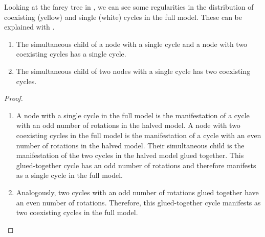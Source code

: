 Looking at the farey tree in , we can see some regularities in the distribution of coexisting (yellow) and single (white) cycles in the full model.
These can be explained with .

\begin{theorem}
	\begin{enumerate}
		\item The simultaneous child of a node with a single cycle and a node with two coexisting cycles has a single cycle.
		\item The simultaneous child of two nodes with a single cycle has two coexisting cycles.
	\end{enumerate}
\end{theorem}

\begin{proof}
	\begin{enumerate}
		\item A node with a single cycle in the full model is the manifestation of a cycle with an odd number of rotations in the halved model.
		      A node with two coexisting cycles in the full model is the manifestation of a cycle with an even number of rotations in the halved model.
		      Their simultaneous child is the manifestation of the two cycles in the halved model glued together.
		      This glued-together cycle has an odd number of rotations and therefore manifests as a single cycle in the full model.
		\item Analogously, two cycles with an odd number of rotations glued together have an even number of rotations.
		      Therefore, this glued-together cycle manifests as two coexisting cycles in the full model.
	\end{enumerate}
\end{proof}

